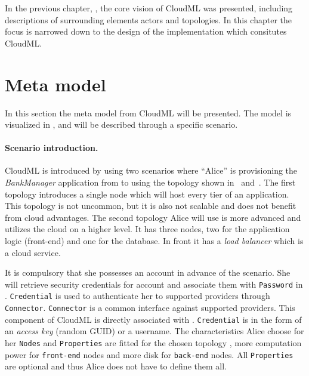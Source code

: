 
In the previous chapter, , the core vision of CloudML was presented,
including descriptions of surrounding elements \ie actors and topologies.
In this chapter the focus is narrowed down to the design of the implementation which
consitutes CloudML.

\section{Meta model}


In this section the meta model from CloudML will be presented.
The model is visualized in , and will be described through a specific scenario.

\paragraph{Scenario introduction.}

CloudML is introduced by using two scenarios where ``Alice'' is provisioning the 
\emph{BankManager} application from  to 
using the topology shown in~ and~.
The first topology introduces a single node which will host every tier of an application.
This topology is not uncommon, but it is also not scalable and does not benefit
from cloud advantages.
The second topology Alice will use is more advanced and utilizes the cloud on a higher level.
It has three nodes, two for the application logic (front-end) and one for the database.
In front it has a \emph{load balancer} which is a cloud service.

It is compulsory that she possesses an  account in advance of the scenario.
She will retrieve security credentials for account 
and associate them with \texttt{Password} in .
\texttt{Credential} is used to authenticate her to supported providers through \texttt{Connector}.
\texttt{Connector} is a common interface against supported providers.
This component of CloudML is directly associated with .
\texttt{Credential} is in the form of an \emph{access key} (random GUID) or a username.
The characteristics Alice choose for her \texttt{Nodes} and \texttt{Properties} are fitted
for the chosen topology \eg, more computation power for \texttt{front-end} nodes and more disk for \texttt{back-end} nodes.
All \texttt{Properties} are optional and thus Alice does not have to define them all.

